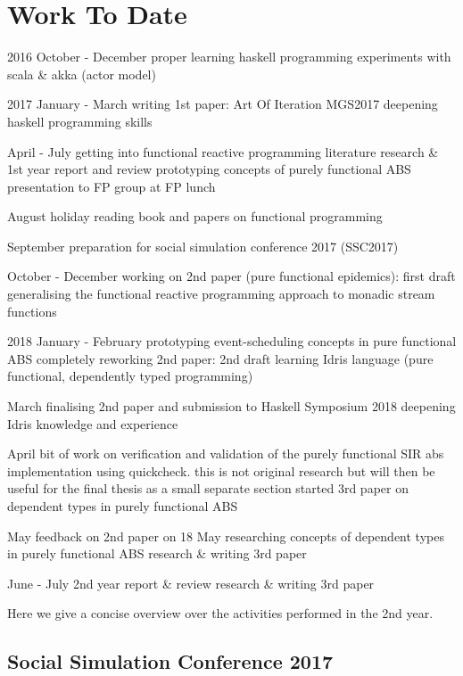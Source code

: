 \chapter{Work To Date}
\label{chap:work}

2016
October - December
	proper learning haskell programming
	experiments with scala \& akka (actor model)
	
2017
January - March
	writing 1st paper: Art Of Iteration
	MGS2017
	deepening haskell programming skills

April - July
	getting into functional reactive programming
	literature research \& 1st year report and review
	prototyping concepts of purely functional ABS
	presentation to FP group at FP lunch

August
	holiday
	reading book and papers on functional programming

September
	preparation for social simulation conference 2017 (SSC2017)

October - December
	working on 2nd paper (pure functional epidemics): first draft
	generalising the functional reactive programming approach to monadic stream functions 

2018
January - February
	prototyping event-scheduling concepts in pure functional ABS
	completely reworking 2nd paper: 2nd draft
	learning Idris language (pure functional, dependently typed programming)

March
	finalising 2nd paper and submission to Haskell Symposium 2018
	deepening Idris knowledge and experience 

April
	bit of work on verification and validation of the purely functional SIR abs implementation using quickcheck. this is not original research but will then be useful for the final thesis as a small separate section
	started 3rd paper on dependent types in purely functional ABS

May
	feedback on 2nd paper on 18 May	
	researching concepts of dependent types in purely functional ABS
	research \& writing 3rd paper

June - July
	2nd year report \& review
	research \& writing 3rd paper




Here we give a concise overview over the activities performed in the 2nd year.

\section{Social Simulation Conference 2017}


